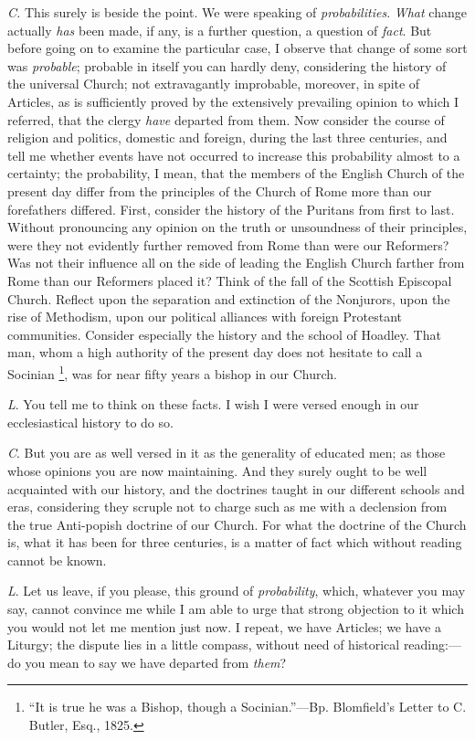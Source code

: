 \emph{C.}
This surely is beside the point. We were speaking of \emph{probabilities}.
\emph{What}
change actually \emph{has} been made, if
any, is a further question, a question of
\emph{fact}. But before going on to examine the particular case, I observe
that change of some sort was \emph{probable};
probable in itself you can hardly deny, considering the history
of the universal Church; not extravagantly improbable, moreover, in
spite of Articles, as is sufficiently proved by the extensively prevailing opinion to which I referred, that the clergy \emph{have}
departed from them. Now consider the course of religion and politics,
domestic and foreign, during the last three centuries, and tell me
whether events have not occurred to increase this probability almost
to a certainty; the probability, I mean, that the members of the
English Church of the present day differ from the principles of the
Church of Rome more than our forefathers differed. First, consider the
history of the Puritans from first to last. Without pronouncing any
opinion on the truth or unsoundness of their principles, were they not
evidently further removed from Rome than were our Reformers? Was not
their influence all on the side of leading the English Church farther
from Rome than our Reformers placed it? Think of the fall of the
Scottish Episcopal Church. Reflect upon the separation and extinction
of the Nonjurors, upon the rise of Methodism, upon our political
alliances with foreign Protestant communities. Consider especially the
history and the school of Hoadley. That man, whom a high authority of
the present day does not hesitate to call a Socinian \footnote{``It is true he was a Bishop, though a
Socinian.''—Bp. Blomfield's Letter to C. Butler, Esq., 1825.}, was for near fifty years a bishop in our Church.

\emph{L}. You tell me to think on these facts. I
wish I were versed enough in our ecclesiastical history to do so.

\emph{C}. But you are as well versed in it as the
generality of educated men; as those whose opinions you are now
maintaining. And they surely ought to be well acquainted with our
history, and the doctrines taught in our different schools and eras,
considering they scruple not to charge such as me with a declension
from the true Anti-popish doctrine of our Church. For what the
doctrine of the Church is, what it has been for three centuries, is a
matter of fact which without reading cannot be known.

\emph{L}. Let us leave, if you please, this
ground of \emph{probability}, which, whatever you may say, cannot
convince me while I am able to urge that strong objection to it which
you would not let me mention just now. I repeat, we have Articles; we
have a Liturgy; the dispute lies in a little compass, without need of
historical reading:—do you mean to say we have departed from \emph{them}?

